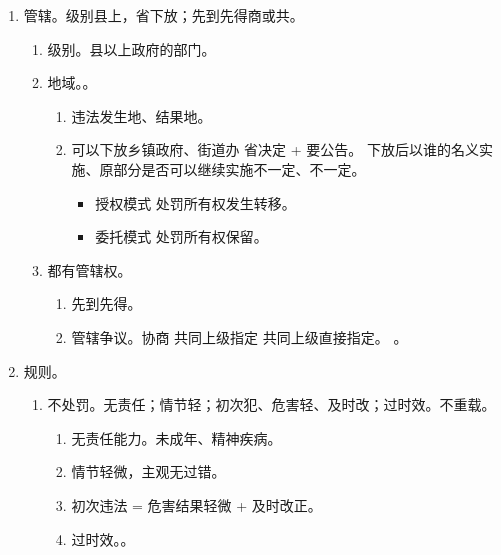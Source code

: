 \begin{enumerate}
\begin{enumerate}
          \item 管辖。级别县上，省下放；先到先得商或共。
                \begin{enumerate}
                  \item 级别。县以上政府的部门。
                  \item 地域。。
                        \begin{enumerate}
                          \item 违法发生地、结果地。
                          \item 可以下放乡镇政府、街道办 \yjt 省决定 + 要公告。
                                下放后以谁的名义实施、原部分是否可以继续实施不一定、不一定。
                                \begin{itemize}
                                  \item 授权模式 \yjt 处罚所有权发生转移。
                                  \item 委托模式 \yjt 处罚所有权保留。
                                \end{itemize}
                        \end{enumerate}
                  \item 都有管辖权。
                        \begin{enumerate}
                          \item 先到先得。
                          \item 管辖争议。协商 \yjt 共同上级指定 \hz 共同上级直接指定。
                                。
                        \end{enumerate}
                \end{enumerate}
          \item 规则。
                \begin{enumerate}
                  \item 不处罚。无责任；情节轻；初次犯、危害轻、及时改；过时效。不重载。
                        \begin{enumerate}
                          \item 无责任能力。未成年、精神疾病。
                          \item 情节轻微，主观无过错。
                          \item 初次违法 = 危害结果轻微 + 及时改正。
                          \item 过时效。。

\end{enumerate}
\end{enumerate}
\end{enumerate}
\end{enumerate}
